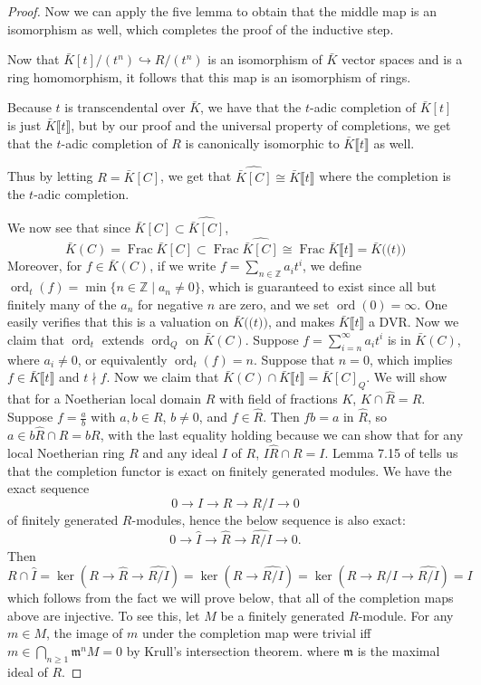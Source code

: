 \documentclass{article}
\newcommand{\llp}{\mathopen{(\!(}}
\newcommand{\rrp}{\mathclose{)\!)}}
\newcommand{\llb}{\llbracket}
\newcommand{\rrb}{\rrbracket}
\theoremstyle{customplain}
\theoremstyle{customdef}
\newcommand{\Z}{\mathbb{Z}}
\newcommand{\frkm}{\mathfrak{m}}
\DeclareMathOperator{\ord}{ord}
\DeclareMathOperator{\Frac}{\mathrm{Frac}}
\theoremstyle{definition} %
\renewcommand{\ge}{\geqslant}
\begin{document}
\begin{proof}
    Now we can apply the five lemma to obtain that the middle map is an isomorphism as well, which completes the proof of the inductive step.

    Now that $\bar K[t]/(t^n) \hookrightarrow R/(t^n)$ is an isomorphism of $\bar K$ vector spaces and is a ring homomorphism, it follows that this map is an isomorphism of rings.

    Because $t$ is transcendental over $\bar K$, we have that the $t$-adic completion of $\bar K[t]$ is just $\bar K\llbracket t \rrbracket$, but by our proof and the universal property of completions, we get that the $t$-adic completion of $R$ is canonically isomorphic to $\bar K \llbracket t \rrbracket$ as well.

    Thus by letting $R=\bar K[C]$, we get that $\widehat{\bar K[C]} \cong \bar K \llbracket t \rrbracket$ where the completion is the $t$-adic completion.

    We now see that since $\bar K[C] \subset \widehat{\bar K[C]}$,
    \[
    \bar K(C)=\Frac \bar K[C] \subset \Frac \widehat{\bar K[C]} \cong \Frac \bar K \llbracket t \rrbracket = \bar K \llp t \rrp
    \]
    Moreover, for $f\in \bar K(C)$, if we write $f=\sum_{n\in \Z} a_i t^i$, we define $\ord_t(f)=\min \{n \in \Z \mid a_n \ne 0\}$, which is guaranteed to exist since all but finitely many of the $a_n$ for negative $n$ are zero, and we set $\ord(0)=\infty$. One easily verifies that this is a valuation on $\bar K\llp t \rrp$, and makes $\bar K\llb t \rrb$ a DVR. Now we claim that $\ord_t$ extends $\ord_Q$ on $\bar K(C).$ Suppose $f=\sum_{i=n}^\infty a_i t^i$ is in $\bar K(C)$, where $a_i\ne 0$, or equivalently $\ord_t(f)=n.$ Suppose that $n= 0$, which implies $f\in \bar K\llb t \rrb$ and $t\nmid f.$ Now we claim that $\bar K(C) \cap \bar K\llb t \rrb= \bar K[C]_Q.$ We will show that for a Noetherian local domain $R$ with field of fractions $K$, $K \cap \widehat{R} = R.$ Suppose $f=\frac{a}{b}$ with $a,b\in R$, $b\ne 0$, and $f\in \widehat{R}.$ Then $fb = a$ in $\widehat{R}$, so $a\in b \widehat{R} \cap R = bR$, with the last equality holding because we can show that for any local Noetherian ring $R$ and any ideal $I$ of $R$, $I\widehat{R}\cap R=I.$ Lemma 7.15 of \cite{eisenbud} tells us that the completion functor is exact on finitely generated modules. We have the exact sequence
    \[
    0\to I \to R\to R/I \to 0
    \]
    of finitely generated $R$-modules, hence the below sequence is also exact:
    \[
    0 \to \widehat{I} \to \widehat{R} \to \widehat{R/I} \to 0.
    \]
    Then
    \[
    R\cap \widehat{I}=\ker(R \to \widehat{R}\to \widehat{R/I}) = \ker(R\to \widehat{R/I}) = \ker(R\to R/I \to \widehat{R/I}) = I
    \]
    which follows from the fact we will prove below, that all of the completion maps above are injective. To see this, let $M$ be a finitely generated $R$-module. For any $m\in M$, the image of $m$ under the completion map were trivial iff $m\in \bigcap_{n\ge 1} \frkm^n M = 0$ by Krull's intersection theorem. where $\frkm$ is the maximal ideal of $R$.


\end{proof}
\end{document}
